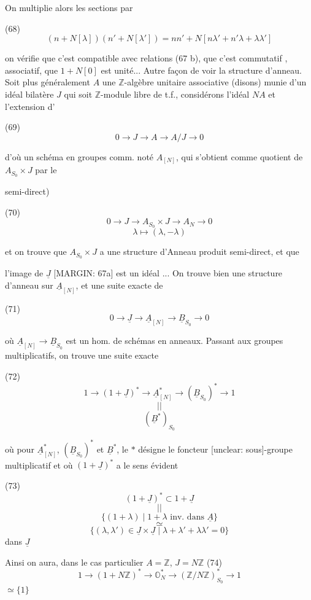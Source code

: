 \newpage


On multiplie alors les sections par

(68) $$ (n+N[\lambda])(n'+N[\lambda']) = nn'+N[n\lambda'+n'\lambda+\lambda\lambda'] $$

on vérifie que c'est compatible avec
relations (67 b), que c'est commutatif ,
associatif, que $1+N[0]$ est
unité... Autre façon de voir la
structure d'anneau. Soit plus
généralement $A$ une $\mathbb{Z}$-algèbre
unitaire associative (disons) munie d'un idéal
bilatère $J$ qui soit $\mathbb{Z}$-module libre de t.f., considérons
l'idéal $NA$ et l'extension d'

(69) $$ 0 \to J \to A \to A/J \to 0 $$

d'où un schéma en groupes comm.
noté $A_{[N]}$, qui s'obtient comme
quotient de $A_{S_0} \times J$ par le

semi-direct)

(70) $$ 0 \to J \to A_{S_0} \times J \to A_N \to 0 $$
$$ \lambda \mapsto (\lambda, - \lambda) $$

et on trouve que $A_{S_0} \times J$ a une structure
d'Anneau produit semi-direct, et que

\newpage


l'image de $\underline{J}$ [MARGIN: 67a] est un idéal ...
On trouve bien une structure d'anneau
sur $\underline{A}_{[N]}$, et une suite exacte de

(71) $$0 \to \underline{J} \to \underline{A}_{[N]} \to \underline{B}_{S_0} \to 0$$

où $\underline{A}_{[N]} \to \underline{B}_{S_0}$ est un hom. de
schémas en anneaux. Passant aux
groupes multiplicatifs, on trouve
une suite exacte

(72) $$1 \to (1+\underline{J})^* \to \underline{A}_{[N]}^* \to (\underline{B}_{S_0})^* \to 1$$
$$||$$
$$(\underline{B}^*)_{S_0}$$

où pour $\underline{A}_{[N]}^*$, $(\underline{B}_{S_0})^*$ et $\underline{B}^*$, le
$*$ désigne le foncteur [unclear: sous]-groupe multiplicatif
et où $(1+\underline{J})^*$ a le sens évident

(73) $$(1+\underline{J})^* \subset 1+\underline{J}$$
$$||$$
$$\{ (1+\lambda) \mid 1+\lambda \text{ inv. dans } \underline{A} \}$$
$$\simeq$$
$$\{ (\lambda,\lambda') \in \underline{J} \times \underline{J} \mid \lambda+\lambda'+\lambda\lambda'=0 \}$$
dans $\underline{J}$

Ainsi on aura, dans le cas particulier
$A = \mathbb{Z}$, $J = N\mathbb{Z}$
(74) $$1 \to (1+N\mathbb{Z})^* \to \mathbb{O}_N^* \to (\mathbb{Z}/N\mathbb{Z})_{S_0}^* \to 1$$
$\simeq \{1\}$

